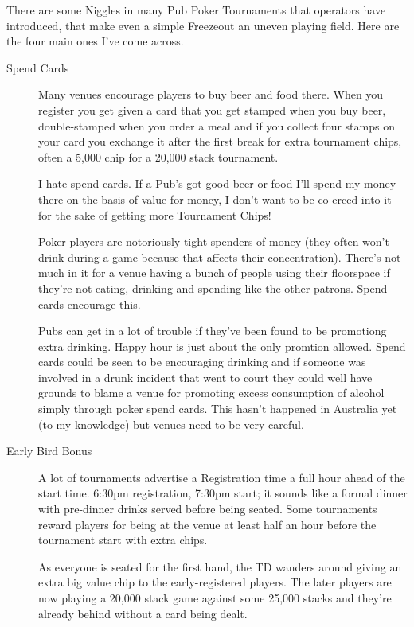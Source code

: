 There are some Niggles in many Pub Poker Tournaments that operators
have introduced, that make even a simple Freezeout an
uneven playing field. Here are the four main ones I've come across.


\begin{description}

\item[Spend Cards] Many venues encourage players to buy beer and food there.
When you register you get given a card that you get stamped when you
buy beer, double-stamped when you order a meal and if you collect four
stamps on your card you exchange it after the first break for extra
tournament chips, often a 5,000 chip for a 20,000 stack tournament.

I hate spend cards. If a Pub's got good beer or food
I'll spend my money there on the basis of value-for-money, I don't
want to be co-erced into it for the sake of getting more Tournament Chips!

Poker players are notoriously tight spenders of money (they often
won't drink during a game because that affects their concentration).
There's not much in it for a venue having a bunch of people using
their floorspace if they're not eating, drinking and spending like
the other patrons. Spend cards encourage this.

Pubs can get in a lot of trouble if they've been found to be
promotiong extra drinking. Happy hour is just about the only
promtion allowed. Spend cards could be seen to be encouraging drinking
and if someone was involved in a drunk incident that went
to court they could well have grounds to blame a venue for 
promoting excess consumption of alcohol simply through poker
spend cards. This hasn't happened in Australia yet (to my knowledge)
but venues need to be very careful.

\item[Early Bird Bonus] A lot of tournaments advertise a Registration
time a full hour ahead of the start time. 6:30pm registration, 7:30pm
start; it sounds like a formal dinner with pre-dinner drinks served
before being seated. Some tournaments reward players for being
at the venue at least half an hour before the tournament start with extra
chips.

As everyone is seated for the first hand, the TD wanders around
giving an extra big value chip to the early-registered players. The
later players are now playing a 20,000 stack game against some
25,000 stacks and they're already behind without a card being dealt.


\end{description}
